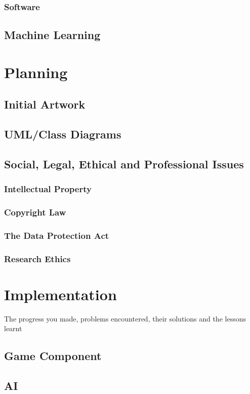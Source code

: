 \documentclass[runningheads,a4paper]{llncs}
\begin{document}
		\subsubsection{Software}

\subsection{Machine Learning}

\section{Planning}
	\subsection{Initial Artwork}
	\subsection{UML/Class Diagrams}
	\subsection{Social, Legal, Ethical and Professional Issues}
		\subsubsection{Intellectual Property}
		\subsubsection{Copyright Law}
		\subsubsection{The Data Protection Act}
		\subsubsection{Research Ethics}

\section{Implementation}
The progress you made, problems encountered, their solutions and the lessons learnt

	\subsection{Game Component}
	\subsection{AI}
\end{document}
